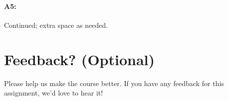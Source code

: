 





\pagebreak
\paragraph{A5:} Continued; extra space as needed.


\pagebreak
\section*{Feedback? (Optional)}
Please help us make the course better. If you have any feedback for this assignment, we'd love to hear it!



